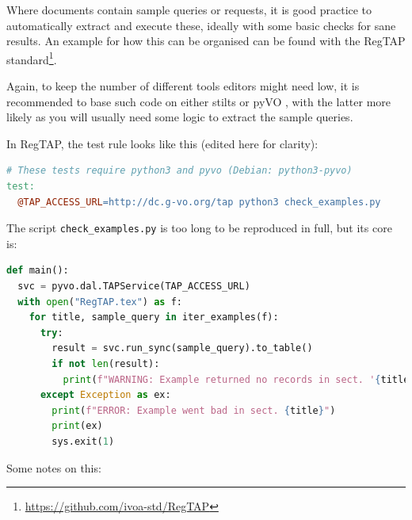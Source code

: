 \documentclass[11pt,a4paper]{ivoa}
\begin{document}
Where documents contain sample queries or requests, it is good practice
to automatically extract and execute these, ideally with some basic
checks for sane results.  An example for how this can be organised can
be found with the RegTAP
standard\footnote{\url{https://github.com/ivoa-std/RegTAP}}.  

Again, to keep the number of different tools editors might need low, it
is recommended to base such code on either stilts or pyVO
\citep{2014ascl.soft02004G}, with the latter more likely as you will
usually need some logic to extract the sample queries.  

In RegTAP, the test rule looks like this (edited here for clarity):

\begin{lstlisting}[language=make,basicstyle=\footnotesize]
# These tests require python3 and pyvo (Debian: python3-pyvo)
test:
  @TAP_ACCESS_URL=http://dc.g-vo.org/tap python3 check_examples.py
\end{lstlisting}

The script \verb|check_examples.py| is too long to be reproduced in
full, but its core is:

\begin{lstlisting}[language=python,basicstyle=\footnotesize]
def main():
  svc = pyvo.dal.TAPService(TAP_ACCESS_URL)
  with open("RegTAP.tex") as f:
    for title, sample_query in iter_examples(f):
      try:
        result = svc.run_sync(sample_query).to_table()
        if not len(result):
          print(f"WARNING: Example returned no records in sect. '{title}'")
      except Exception as ex:
        print(f"ERROR: Example went bad in sect. {title}")
        print(ex)
        sys.exit(1)
\end{lstlisting}

Some notes on this:
\end{document}
